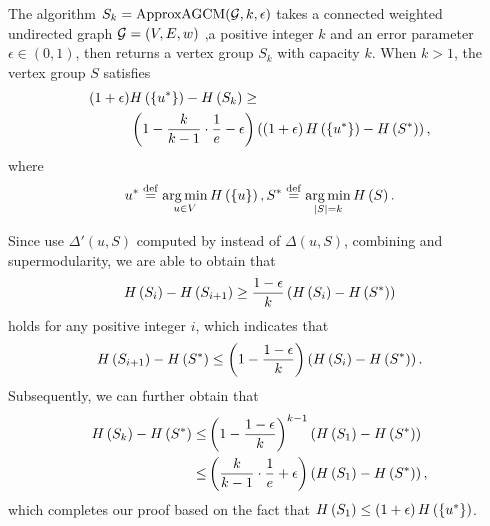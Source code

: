 \documentclass[10pt,twocolumn,twoside]{IEEEtran}
\begin{document}

\begin{theorem}
    The algorithm \(S_k=\text{ApproxAGCM}(\mathcal{G},k,\epsilon)\) takes a connected weighted undirected graph \(\mathcal{G}=(V,E,w)\) ,a positive integer \(k\) and an error parameter \(\epsilon\in(0,1)\), then returns a vertex group \(S_k\) with capacity \(k\). When \(k>1\), the vertex group \(S\) satisfies
    \begin{align*}
        \left( 1+\epsilon \right) & H\left(\left\{u^* \right\}\right)-H\left(S_k\right)\ge                                                                         \\
                           & \left( 1-\frac{k}{k-1}\cdot\frac{1}{e}-\epsilon \right)\left( \left( 1+\epsilon \right)H\left(\left\{u^* \right\}\right)-H\left(S^*\right) \right),
    \end{align*}
    where
    \[u^*\stackrel{\mathrm{def}}{=}\operatorname*{arg\,min}_{u\in V}H\left(\left\{u \right\}\right),S^*\stackrel{\mathrm{def}}{=}\operatorname*{arg\,min}_{\left|S \right|=k}H\left(S\right).\]
\end{theorem}
\begin{IEEEproof}
    Since  use \(\Delta'(u,S)\) computed by  instead of \(\Delta(u,S)\), combining  and supermodularity, we are able to obtain that
    \begin{equation*}
        H\left(S_i\right)-H\left(S_{i+1}\right)\ge\frac{1-\epsilon}{k}\left( H\left(S_i\right)-H\left(S^*\right) \right)
    \end{equation*}
    holds for any positive integer \(i\), which indicates that
    \begin{equation*}
        H\left(S_{i+1}\right)-H\left(S^*\right)\le\left( 1-\frac{1-\epsilon}{k} \right)\left( H\left(S_i\right)-H\left(S^*\right) \right).
    \end{equation*}
    Subsequently, we can further obtain that
    \begin{align*}
        H\left(S_k\right)-H\left(S^*\right) \le & \left( 1-\frac{1-\epsilon}{k} \right)^{k-1}\left( H\left(S_1\right)-H\left(S^*\right) \right)            \\
        \le                       & \left( \frac{k}{k-1}\cdot\frac{1}{e}+\epsilon \right)\left( H\left(S_1\right)-H\left(S^*\right) \right),
    \end{align*}
    which completes our proof based on the fact that \(H\left(S_1\right)\le\left( 1+\epsilon \right)H\left(\left\{u^* \right\}\right)\).
\end{IEEEproof}
\end{document}
